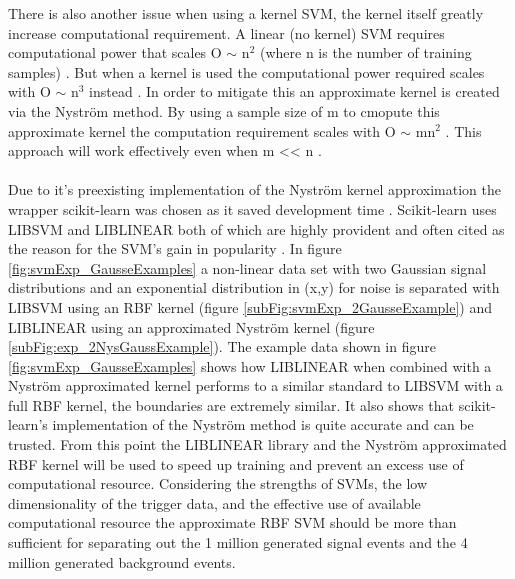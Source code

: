 There is also another issue when using a kernel SVM, the kernel itself greatly increase computational requirement. A linear (no kernel) SVM requires computational power that scales O $\sim$ n$^2$ (where n is the number of training samples) \cite{cortes1995support}. But when a kernel is used the computational power required scales with O $\sim$ n$^3$ instead \cite{williams2001using}. In order to mitigate this an approximate kernel is created via the Nyström method. By using a sample size of m to cmopute this approximate kernel the computation requirement scales with O $\sim$ mn$^2$ \cite{williams2001using}. This approach will work effectively even when m << n \cite{williams2001using}. 
\\\\Due to it's preexisting implementation of the Nyström kernel approximation the wrapper scikit-learn was chosen as it saved development time \cite{scikit-learn}. Scikit-learn uses LIBSVM \cite{chang2011libsvm} and LIBLINEAR \cite{fan2008liblinear} both of which are highly provident and often cited as the reason for the SVM's gain in popularity \cite{murty2016support}. In figure \ref{fig:svmExp_GausseExamples} a non-linear data set with two Gaussian signal distributions and an exponential distribution in (x,y) for noise is separated with LIBSVM using an RBF kernel (figure \ref{subFig:svmExp_2GausseExample}) and LIBLINEAR using an approximated Nyström kernel (figure \ref{subFig:exp_2NysGaussExample}). The example data shown in figure \ref{fig:svmExp_GausseExamples} shows how LIBLINEAR when combined with a Nyström approximated kernel performs to a similar standard to LIBSVM with a full RBF kernel, the boundaries are extremely similar. It also shows that scikit-learn's implementation of the Nyström method is quite accurate and can be trusted. From this point the LIBLINEAR library and the Nyström approximated RBF kernel will be used to speed up training and prevent an excess use of computational resource. Considering the strengths of SVMs, the low dimensionality of the trigger data, and the effective use of available computational resource the approximate RBF SVM should be more than sufficient for separating out the 1 million generated signal events and the 4 million generated background events. 


